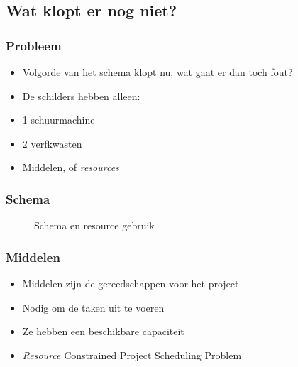 \documentclass{beamer}
\theoremstyle{definition}
\newcommand{\inputtikz}[1]{}
\begin{document}
\subsection{Wat klopt er nog niet?}
\begin{frame}
	\frametitle{Probleem}
	\begin{itemize}
		\item Volgorde van het schema klopt nu, wat gaat er dan toch fout?
		\item<2->  De schilders hebben alleen:
		\item<2-> 1 schuurmachine
		\item<2-> 2 verfkwasten
		\item<3-> Middelen, of \emph{resources}
	\end{itemize}
\end{frame}

\begin{frame}
\frametitle{Schema}
	\vspace{-1.2em}
	\begin{figure}[ht]
		\makebox[\textwidth][c]{\resizebox{.36\paperwidth}{!}{
			\inputtikz{schedule_infeasible_colored_profile}
		}}
		\vspace{-1.3em}
		\caption{Schema en resource gebruik}
	\end{figure}
\end{frame}

\begin{frame}
	\frametitle{Middelen}
	\begin{itemize}
		\item Middelen zijn de gereedschappen voor het project
		\item Nodig om de taken uit te voeren
		\item Ze hebben een beschikbare capaciteit
		\item \emph{Resource} Constrained Project Scheduling Problem
	\end{itemize}
\end{frame}
\end{document}
